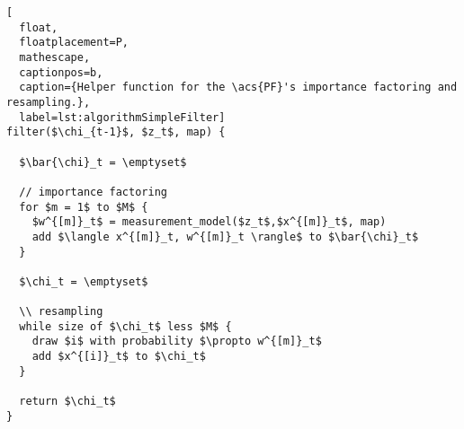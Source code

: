 \begin{lstlisting}[
  float,
  floatplacement=P,
  mathescape,
  captionpos=b,
  caption={Helper function for the \acs{PF}'s importance factoring and resampling.},
  label=lst:algorithmSimpleFilter]
filter($\chi_{t-1}$, $z_t$, map) {

  $\bar{\chi}_t = \emptyset$

  // importance factoring
  for $m = 1$ to $M$ {
    $w^{[m]}_t$ = measurement_model($z_t$,$x^{[m]}_t$, map)
    add $\langle x^{[m]}_t, w^{[m]}_t \rangle$ to $\bar{\chi}_t$
  }

  $\chi_t = \emptyset$

  \\ resampling
  while size of $\chi_t$ less $M$ {
    draw $i$ with probability $\propto w^{[m]}_t$
    add $x^{[i]}_t$ to $\chi_t$
  }

  return $\chi_t$
}
\end{lstlisting}
